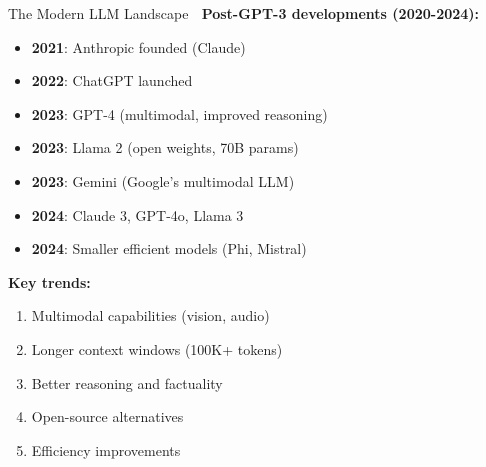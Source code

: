 \documentclass[aspectratio=169]{beamer}
\begin{document}
\begin{frame}[shrink=10]{The Modern LLM Landscape 🌈}
    \textbf{Post-GPT-3 developments (2020-2024):}

    \vspace{0.3cm}

    \begin{itemize}\setlength{\itemsep}{0pt}
        \item \textbf{2021}: Anthropic founded (Claude)
        \item \textbf{2022}: ChatGPT launched
        \item \textbf{2023}: GPT-4 (multimodal, improved reasoning)
        \item \textbf{2023}: Llama 2 (open weights, 70B params)
        \item \textbf{2023}: Gemini (Google's multimodal LLM)
        \item \textbf{2024}: Claude 3, GPT-4o, Llama 3
        \item \textbf{2024}: Smaller efficient models (Phi, Mistral)
    \end{itemize}

    \vspace{0.3cm}

    \textbf{Key trends:}
    \begin{enumerate}\setlength{\itemsep}{0pt}
        \item Multimodal capabilities (vision, audio)
        \item Longer context windows (100K+ tokens)
        \item Better reasoning and factuality
        \item Open-source alternatives
        \item Efficiency improvements
    \end{enumerate}
\end{frame}
\end{document}
